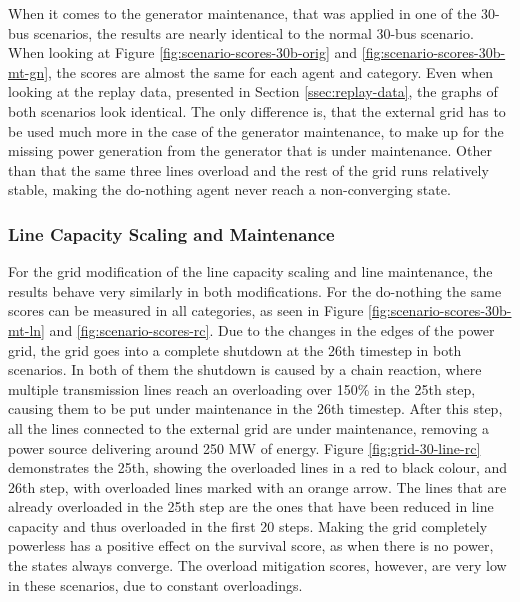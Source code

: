 When it comes to the generator maintenance, that was applied in one of the 30-bus scenarios, the results are nearly identical to the normal 30-bus scenario. When looking at Figure \ref{fig:scenario-scores-30b-orig} and \ref{fig:scenario-scores-30b-mt-gn}, the scores are almost the same for each agent and category. Even when looking at the replay data, presented in Section \ref{ssec:replay-data}, the graphs of both scenarios look identical. The only difference is, that the external grid has to be used much more in the case of the generator maintenance, to make up for the missing power generation from the generator that is under maintenance. Other than that the same three lines overload and the rest of the grid runs relatively stable, making the do-nothing agent never reach a non-converging state. 

\subsubsection{Line Capacity Scaling and Maintenance}
For the grid modification of the line capacity scaling and line maintenance, the results behave very similarly in both modifications. For the do-nothing the same scores can be measured in all categories, as seen in Figure \ref{fig:scenario-scores-30b-mt-ln} and \ref{fig:scenario-scores-rc}. Due to the changes in the edges of the power grid, the grid goes into a complete shutdown at the 26th timestep in both scenarios. In both of them the shutdown is caused by a chain reaction, where multiple transmission lines reach an overloading over 150\% in the 25th step, causing them to be put under maintenance in the 26th timestep. After this step, all the lines connected to the external grid are under maintenance, removing a power source delivering around 250 MW of energy. Figure \ref{fig:grid-30-line-rc} demonstrates the 25th, showing the overloaded lines in a red to black colour, and 26th step, with overloaded lines marked with an orange arrow. The lines that are already overloaded in the 25th step are the ones that have been reduced in line capacity and thus overloaded in the first 20 steps. Making the grid completely powerless has a positive effect on the survival score, as when there is no power, the states always converge. The overload mitigation scores, however, are very low in these scenarios, due to constant overloadings.

